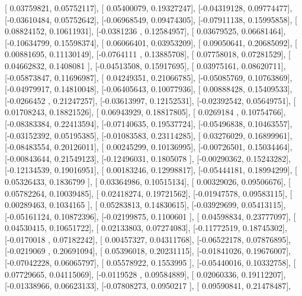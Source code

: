 \documentclass{article}
\begin{document}
       [ 0.03759821,  0.05752117],
       [ 0.05400079,  0.19327247],
       [-0.04319128,  0.09774477],
       [-0.03610484,  0.05752642],
       [-0.06968549,  0.09474305],
       [-0.07911138,  0.15995858],
       [ 0.08824152,  0.10611931],
       [-0.0381236 ,  0.12584957],
       [ 0.03679525,  0.06681464],
       [-0.10634799,  0.15598374],
       [ 0.06066401,  0.03953209],
       [ 0.09050641,  0.20685092],
       [ 0.00881695,  0.11130149],
       [-0.0764111 ,  0.13885708],
       [ 0.07758018,  0.07281529],
       [ 0.04662832,  0.1408081 ],
       [-0.04513508,  0.15917695],
       [ 0.03975161,  0.08620711],
       [-0.05873847,  0.11696987],
       [ 0.04249351,  0.21066785],
       [-0.05085769,  0.10763869],
       [-0.04979917,  0.14810048],
       [-0.06405643,  0.10077936],
       [ 0.00888428,  0.15409533],
       [-0.0266452 ,  0.21247257],
       [-0.03613997,  0.12152531],
       [-0.02392542,  0.05649751],
       [ 0.01708243,  0.18821526],
       [ 0.06943929,  0.18817805],
       [ 0.0269184 ,  0.10754766],
       [-0.08383384,  0.22413594],
       [-0.07140635,  0.19537724],
       [-0.05496838,  0.10463557],
       [-0.03152392,  0.05195385],
       [-0.01083583,  0.23114285],
       [ 0.03276029,  0.16899961],
       [-0.08483554,  0.20126011],
       [ 0.00245299,  0.10136995],
       [-0.00726501,  0.15034464],
       [-0.00843644,  0.21549123],
       [-0.12496031,  0.1805078 ],
       [-0.00290362,  0.15243282],
       [-0.12134539,  0.19016951],
       [ 0.00183246,  0.12998817],
       [-0.05444181,  0.18994299],
       [ 0.05326433,  0.1836799 ],
       [ 0.03364986,  0.10515134],
       [ 0.00329026,  0.09506676],
       [ 0.05782264,  0.10039485],
       [ 0.02418274,  0.19721562],
       [-0.01947578,  0.09583115],
       [ 0.00289463,  0.1034165 ],
       [ 0.05283813,  0.14830615],
       [-0.03929699,  0.05413115],
       [-0.05161124,  0.10872396],
       [-0.02199875,  0.1100601 ],
       [ 0.04598834,  0.23777097],
       [ 0.04530415,  0.10651722],
       [ 0.02133803,  0.07274083],
       [-0.11772519,  0.18745302],
       [-0.0170018 ,  0.07182242],
       [ 0.00457327,  0.04311768],
       [-0.06522178,  0.07876895],
       [-0.0219069 ,  0.20691094],
       [ 0.05396018,  0.20231115],
       [-0.01841026,  0.19676007],
       [-0.07042228,  0.06065797],
       [ 0.05578922,  0.1553995 ],
       [-0.05440016,  0.10332758],
       [ 0.07729665,  0.04115069],
       [-0.0119528 ,  0.09584889],
       [ 0.02060336,  0.19112207],
       [-0.01338966,  0.06623133],
       [-0.07808273,  0.0950217 ],
       [ 0.09590841,  0.21478487],
\end{document}
